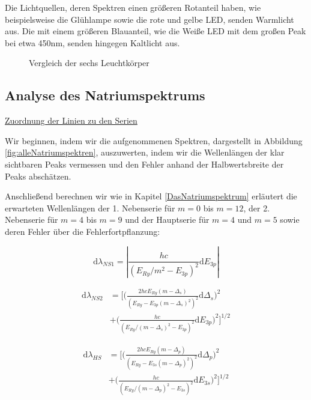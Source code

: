 \documentclass{article}
\begin{document}
Die Lichtquellen, deren Spektren einen größeren Rotanteil haben, wie beispielsweise die Glühlampe sowie die rote und gelbe LED, senden Warmlicht aus. Die mit einem größeren Blauanteil, wie die Weiße LED mit dem großen Peak bei etwa 450nm, senden hingegen Kaltlicht aus. 

\phantom{.}

\begin{figure}[!h]
    \centering
    \caption{Vergleich der sechs Leuchtkörper}
    \label{fig:VglLeuchtkörper}
\end{figure}


\newpage

\subsection{Analyse des Natriumspektrums}

\underline{Zuordnung der Linien zu den Serien}

Wir beginnen, indem wir die aufgenommenen Spektren, dargestellt in Abbildung \ref{fig:alleNatriumspektren}, auszuwerten, indem wir die Wellenlängen der klar sichtbaren Peaks vermessen und den Fehler anhand der Halbwertsbreite der Peaks abschätzen.

Anschließend berechnen wir wie in Kapitel \ref{DasNatriumspektrum} erläutert die erwarteten Wellenlängen der 1. Nebenserie für $m = 0$ bis $m = 12$, der 2. Nebenserie für $m = 4$ bis $m = 9$ und der Hauptserie für $m = 4$ und $m = 5$ sowie deren Fehler über die Fehlerfortpflanzung: 

\begin{equation}
    \text{d} \lambda_{NS1} = \left| \frac{hc}{(E_{Ry}/m^2 - E_{3p})^2} \text{d}E_{3p} \right|  
\end{equation}

\begin{equation}
    \begin{split}
        \text{d} \lambda_{NS2} &= \Biggl[ \Biggl(\frac{2 hc E_{Ry} (m-\Delta_s)}{(E_{Ry} - E_{3p} (m-\Delta_s)^2)^2} \text{d}\Delta_s \Biggr)^2 \\
        &+ \Biggl( \frac{hc}{(E_{Ry}/(m - \Delta_s)^2 - E_{3p})^2} \text{d}E_{3p} \Biggr)^2 \Biggr]^{1/2}
    \end{split}
\end{equation}

\begin{equation}
    \begin{split}
        \text{d} \lambda_{HS} &= \Biggl[ \Biggl(\frac{2 hc E_{Ry} (m-\Delta_p)}{(E_{Ry} - E_{3s} (m-\Delta_p)^2)^2} \text{d}\Delta_p \Biggr)^2 \\
        &+ \Biggl( \frac{hc}{(E_{Ry}/(m - \Delta_p)^2 - E_{3s})^2} \text{d}E_{3s} \Biggr)^2 \Biggr]^{1/2}
    \end{split}
\end{equation}
\end{document}
